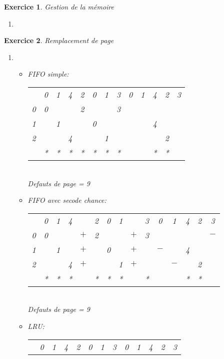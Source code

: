 \documentclass{article}
\theoremstyle{plain}
\newtheorem{exo}{Exercice}%
\begin{document}
\begin{exo} Gestion de la mémoire
\begin{enumerate}
    \item 
\end{enumerate}
\end{exo}


\begin{exo} Remplacement de page
\begin{enumerate}
    \item \begin{itemize}
        \item FIFO simple:\\
            \begin{tabular}{c c c c c c c c c c c c c}
                    & 0 & 1 & 4 & 2 & 0 & 1 & 3 & 0 & 1 & 4 & 2 & 3 \\
                0   & 0 &   &   & 2 &   &   & 3 &   &   &   &   &   \\
                1   &   & 1 &   &   & 0 &   &   &   &   & 4 &   &   \\
                2   &   &   & 4 &   &   & 1 &   &   &   &   & 2 &   \\
                    & * & * & * & * & * & * & * &   &   & * & * &
            \end{tabular}\\
            Defauts de page = 9
        \item  FIFO avec secode chance:\\
            \begin{tabular}{c c c c r c c c c r c c c c c}
                    & 0 & 1 & 4 &   & 2 & 0 & 1 &   & 3 & 0 & 1 & 4 & 2 & 3 \\
                0   & 0 &   &   & $+$ & 2 &   &   & $+$ & 3 &   &   &   &   & $-$  \\
                1   &   & 1 &   & $+$ &   & 0 &   & $+$ &   & $-$ &   & 4 &   &   \\
                2   &   &   & 4 & $+$ &   &   & 1 & $+$ &   &   & $-$ &   & 2 &   \\
                    & * & * & * & & * & * & * & & * &    &   & * & * & 
            \end{tabular}\\
            Defauts de page = 9
        \item  LRU:\\
            \begin{tabular}{c c c c c c c c c c c c c}
                    & 0 & 1 & 4 & 2 & 0 & 1 & 3 & 0 & 1 & 4 & 2 & 3 \\

\end{tabular}
\end{itemize}
\end{enumerate}
\end{exo}
\end{document}
